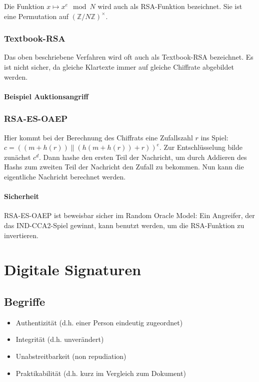 \documentclass[a4paper,twoside,DIV15,BCOR12mm]{scrbook}
\begin{document}
Die Funktion $x \mapsto x^e \mod N$ wird auch als RSA-Funktion bezeichnet. Sie ist eine Permutation auf $(\mathbb{Z}/N\mathbb{Z})^\times$.

\subsection{Textbook-RSA}

Das oben beschriebene Verfahren wird oft auch als Textbook-RSA bezeichnet.  Es ist nicht sicher, da gleiche Klartexte immer auf gleiche Chiffrate abgebildet werden.

\subsubsection{Beispiel Auktionsangriff}


\subsection{RSA-ES-OAEP} \label{rsa-es-oaep}

Hier kommt bei der Berechnung des Chiffrats eine Zufallszahl $r$ ins Spiel: $c = ((m + h(r)) \| (h(m + h(r)) +r))^e$. Zur Entschlüsselung bilde zunächst $c^d$. Dann hashe den ersten Teil der Nachricht, um durch Addieren des Hashs zum zweiten Teil der Nachricht den Zufall zu bekommen. Nun kann die eigentliche Nachricht berechnet werden.

\subsubsection{Sicherheit}

RSA-ES-OAEP ist beweisbar sicher im Random Oracle Model: Ein Angreifer, der das IND-CCA2-Spiel gewinnt, kann benutzt werden, um die RSA-Funktion zu invertieren.



\chapter{Digitale Signaturen} \label{digitale_signaturen}

\section{Begriffe}

\begin{itemize}	
	\item Authentizität (d.h. einer Person eindeutig zugeordnet)
	\item Integrität (d.h. unverändert)
	\item Unabstreitbarkeit (non repudiation)
	\item Praktikabilität (d.h. kurz im Vergleich zum Dokument)
\end{itemize}
\end{document}
